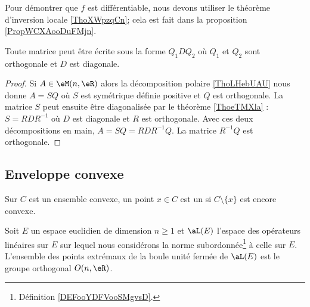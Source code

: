 \begin{remark}  \label{RemBJCBooGLiRmG}
    Pour démontrer que \( f\) est différentiable, nous devons utiliser le théorème d'inversion locale \ref{ThoXWpzqCn}; cela est fait dans la proposition \ref{PropWCXAooDuFMjn}.
\end{remark}

\begin{corollary}       \label{CorAWYBooNCCQSf}
    Toute matrice peut être écrite sous la forme \( Q_1DQ_2\) où \( Q_1\) et \( Q_2\) sont orthogonale et \( D\) est diagonale.
\end{corollary}

\begin{proof}
    Si \( A\in\eM(n,\eR)\) alors la décomposition polaire \ref{ThoLHebUAU} nous donne \( A=SQ\) où \( S\) est symétrique définie positive et \( Q\) est orthogonale. La matrice \( S\) peut ensuite être diagonalisée par le théorème \ref{ThoeTMXla} : \( S=RDR^{-1}\) où \( D\) est diagonale et \( R\) est orthogonale. Avec ces deux décompositions en main, \( A=SQ=RDR^{-1}Q\). La matrice \( R^{-1}Q\) est orthogonale.
\end{proof}

\subsection{Enveloppe convexe}

\begin{definition}
    Sur \( C\) est un ensemble convexe, un point \( x\in C\) est un  si \( C\setminus\{ x \}\) est encore convexe.
\end{definition}

\begin{theorem} \label{ThoBALmoQw}
    Soit \( E\) un espace euclidien de dimension \( n\geq 1\) et \( \aL(E)\) l'espace des opérateurs linéaires sur \( E\) sur lequel nous considérons la norme subordonnée\footnote{Définition \ref{DEFooYDFVooSMgvsD}.} à celle sur \( E\). L'ensemble des points extrémaux de la boule unité fermée de \( \aL(E)\) est le groupe orthogonal \( O(n,\eR)\).
\end{theorem}

